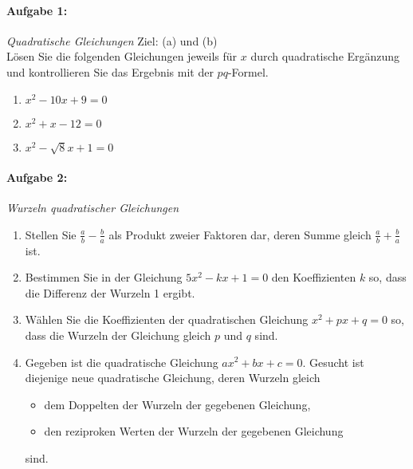 
\paragraph{Aufgabe 1: } \emph{Quadratische Gleichungen} \hfill Ziel: (a) und (b)\\[0.2cm]
Lösen Sie die folgenden Gleichungen jeweils für $x$ durch quadratische Ergänzung und kontrollieren Sie das Ergebnis mit der $pq$-Formel.
\begin{enumerate}[label=(\alph*)]
    \item $x^2-10x+9=0$
    \item $x^2+x-12=0$
    \item $x^2-\sqrt{8}x+1=0$
\end{enumerate}

\paragraph{Aufgabe 2: } \emph{Wurzeln quadratischer Gleichungen}
\begin{enumerate}[label=(\alph*)]
    \item Stellen Sie $\textstyle\frac{a}{b}-\frac{b}{a}$ als Produkt zweier Faktoren dar, deren Summe gleich $\textstyle\frac{a}{b}+\frac{b}{a}$ ist.
    \item Bestimmen Sie in der Gleichung $5x^2-kx+1=0$ den Koeffizienten $k$ so, dass die Differenz der Wurzeln 1 ergibt.
    \item Wählen Sie die Koeffizienten der quadratischen Gleichung $x^2+px+q=0$ so, dass die Wurzeln der Gleichung gleich $p$ und $q$ sind.
    \item Gegeben ist die quadratische Gleichung $ax^2+bx+c=0$. Gesucht ist diejenige neue quadratische Gleichung, deren Wurzeln gleich
    \begin{itemize}[labelindent=1em,labelsep=0.5cm]
        \item dem Doppelten der Wurzeln der gegebenen Gleichung,
        \item den reziproken Werten der Wurzeln der gegebenen Gleichung
    \end{itemize}
    sind.
\end{enumerate}

